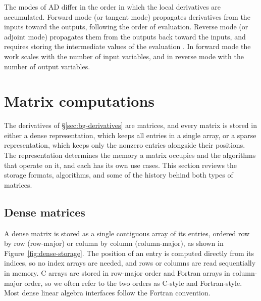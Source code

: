 The modes of AD differ in the order in which the local derivatives are accumulated.
Forward mode (or tangent mode) propagates derivatives from the inputs toward the outputs,
following the order of evaluation.
Reverse mode (or adjoint mode) propagates them from the outputs back toward the inputs, and
requires storing the intermediate values of the evaluation \cite{baydin2017ADsurvey}.
In forward mode the work scales with the number of input variables, and in reverse mode with
the number of output variables.

\section{Matrix computations}\label{sec:intro-matrix}
The derivatives of \S\ref{sec:bg-derivatives} are matrices, and every matrix is stored in
either a dense representation, which keeps all entries in a single array, or a sparse
representation, which keeps only the nonzero entries alongside their positions.
The representation determines the memory a matrix occupies and the algorithms that operate on
it, and each has its own use cases.
This section reviews the storage formats, algorithms, and some of the history behind both
types of matrices.

\subsection{Dense matrices}\label{sec:bg-blas}
A dense matrix is stored as a single contiguous array of its entries, ordered row by row
(row-major) or column by column (column-major), as shown in Figure~\ref{fig:dense-storage}.
The position of an entry is computed directly from its indices, so no index arrays are
needed, and rows or columns are read sequentially in memory.
C arrays are stored in row-major order and Fortran arrays in column-major order, so we often
refer to the two orders as C-style and Fortran-style.
Most dense linear algebra interfaces follow the Fortran convention.

